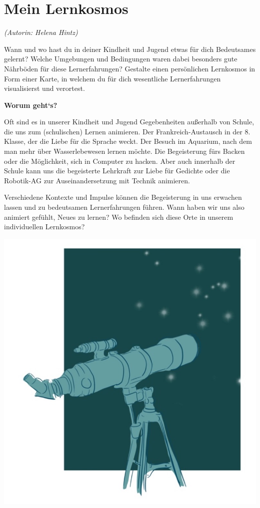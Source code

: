 \documentclass[
  a4paper,
]{book}
\begin{document}
\section{Mein Lernkosmos}\label{mein-lernkosmos}

\emph{(Autorin: Helena Hintz)}

Wann und wo hast du in deiner Kindheit und Jugend etwas für dich Bedeutsames gelernt? Welche Umgebungen und Bedingungen waren dabei besonders gute Nährböden für diese Lernerfahrungen? Gestalte einen persönlichen Lernkosmos in Form einer Karte, in welchem du für dich wesentliche Lernerfahrungen visualisierst und verortest.

\textbf{Worum geht`s?}

Oft sind es in unserer Kindheit und Jugend Gegebenheiten außerhalb von Schule, die uns zum (schulischen) Lernen animieren. Der Frankreich-Austausch in der 8. Klasse, der die Liebe für die Sprache weckt. Der Besuch im Aquarium, nach dem man mehr über Wasserlebewesen lernen möchte. Die Begeisterung fürs Backen oder die Möglichkeit, sich in Computer zu hacken. Aber auch innerhalb der Schule kann uns die begeisterte Lehrkraft zur Liebe für Gedichte oder die Robotik-AG zur Auseinandersetzung mit Technik animieren.

Verschiedene Kontexte und Impulse können die Begeisterung in uns erwachen lassen und zu bedeutsamen Lernerfahrungen führen. Wann haben wir uns also animiert gefühlt, Neues zu lernen? Wo befinden sich diese Orte in unserem individuellen Lernkosmos?

\begin{center}\includegraphics{Figures/04-03-Lernkosmos} \end{center}
\end{document}
